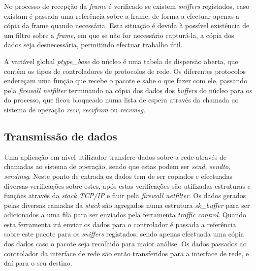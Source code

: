 No processo de recepção da \textit{frame} é verificado se existem \textit{sniffers} registados, caso existam é passada uma referência sobre a frame, de forma a efectuar apenas a cópia da frame quando necessária. Esta situação é devida à possível existência de um filtro sobre a \textit{frame}, em que se não for necessário capturá-la, a cópia dos dados seja desnecessária, permitindo efectuar trabalho útil.





A variável global \textit{ptype\_base} do núcleo é uma tabela de dispersão aberta, que contém os tipos de controladores de protocolos de rede. Os diferentes protocolos endereçam uma função que recebe o pacote e sabe o que fazer com ele, passando pela \textit{firewall netfilter} terminando na cópia dos dados dos \textit{buffers} do núcleo para os do processo, que ficou bloqueado numa lista de espera através da chamada ao sistema de operação \textit{recv}, \textit{recvfrom} ou \textit{recvmsg}.

\subsection{Transmissão de dados}

Uma aplicação em nível utilizador transfere dados sobre a rede através de chamadas ao sistema de operação, sendo que estas podem ser \textit{send}, \textit{sendto}, \textit{sendmsg}.
 Neste ponto de entrada os dados tem de ser copiados e efectuadas diversas verificações sobre estes, após estas verificações são utilizadas estruturas e funções através da \textit{stack TCP/IP} e fluir pela \textit{firewall netfilter}.
 Os dados gerados pelas diversas camadas da \textit{stack} são agregados numa estrutura \textit{sk\_buffer} para ser adicionados a uma fila para ser enviados pela ferramenta \textit{traffic control}.
 Quando esta ferramenta irá enviar os dados para o controlador é passada a referência sobre este pacote para os \textit{sniffers} registados, sendo apenas efectuada uma cópia dos dados caso o pacote seja recolhido para maior análise. Os dados passados ao controlador da interface de rede são então transferidos para a interface de rede, e daí para o seu destino.

